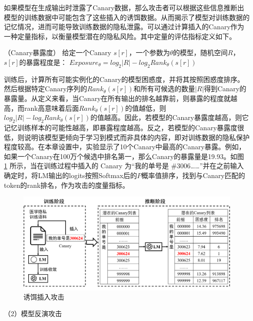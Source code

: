如果模型在生成输出时泄露了Canary数据，那么攻击者可以根据这些信息推断出模型的训练数据中可能包含了这些插入的诱饵数据。从而揭示了模型对训练数据的记忆情况，进而可能导致训练数据的隐私泄露。可以通过计算插入的Canary作为一种定量指标，以衡量模型潜在的隐私风险。其中定量的评估指标定义如下。

\begin{definition}{（Canary暴露度\cite{canary}）}
	给定一个Canary $s[r]$，一个参数为$\theta$的模型，随机空间$R$，$s[r]$的暴露程度是：
	$Exposure_\theta=log_2 |R|-log_2 Rank_\theta(s[r])$
	\label{Canary_Insertion}
\end{definition}

训练后，计算所有可能实例化的Canary的模型困惑度，并将其按照困惑度排序。然后根据特定Canary序列的$Rank_\theta(s[r])$和所有可候选的数量$|R|$得到Canary的暴露量。从定义来看，当Canary在所有输出的排名越靠前，则暴露的程度就越高，而rank高意味着后面$Rank_\theta(s[r])$的值越低，则$log_2 |R|-log_2 Rank_\theta(s[r])$的值越高。因此，若模型的Canary暴露度越高，则它记忆训练样本的可能性越高，即暴露程度越高。反之，若模型的Canary暴露度很低，则说明该模型更倾向于学习到模式而非具体的内容，即对训练数据的隐私保护程度较高。在本章设置中，实验显示了10个Canary中最高的Canary暴露。例如，如果一个Canary在100万个候选中排名第一，那么Canary的暴露量是19.93。如图 \ref{Chap5_CanaryInsertion} 所示，当在训练过程中插入的 Canary 为“我的单号是 \#3006……”并在之前输入确定时，将LM输出的logits按照Softmax后的$P$概率值排序，找到与Canary匹配的token的rank排名，作为攻击的度量指标。


\begin{figure}[h]
	\centering
	\includegraphics[width=\linewidth]{figures/Chap5_CanaryInsertion.png}
	\caption{诱饵插入攻击}
	\label{Chap5_CanaryInsertion}
\end{figure}


（2）模型反演攻击

